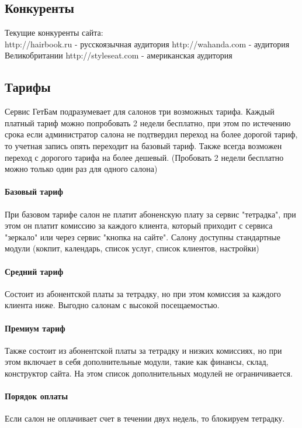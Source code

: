 \documentclass[DIV=calc, paper=a4, fontsize=11pt]{scrartcl} %
\begin{document}
\subsection{Конкуренты}
Текущие конкуренты сайта:
\\[0.5cm]
http://hairbook.ru - русскоязычная аудитория
\newline http://wahanda.com - аудитория Великобритании
\newline http://styleseat.com - американская аудитория

\subsection{Тарифы} \label{subsec:tariffs}
Сервис ГетБам подразумевает для салонов три возможных тарифа. Каждый платный тариф можно попробовать 2 недели бесплатно, при этом по истечению срока если администратор салона не подтвердил переход на более дорогой тариф, то учетная запись опять переходит на базовый тариф. Также всегда возможен переход с дорогого тарифа на более дешевый. (Пробовать 2 недели бесплатно можно только один раз для одного салона)

\paragraph{Базовый тариф}
При базовом тарифе салон не платит абоненскую плату за сервис "тетрадка", при этом он платит комиссию за каждого клиента, который приходит с сервиса "зеркало" или через сервис "кнопка на сайте". Салону доступны стандартные модули (кокпит, календарь, список услуг, список клиентов, настройки)

\paragraph{Средний тариф}
Состоит из абонентской платы за тетрадку, но при этом комиссия за каждого клиента ниже. Выгодно салонам с высокой посещаемостью.

\paragraph{Премиум тариф}
Также состоит из абонентской платы за тетрадку и низких комиссиях, но при этом включает в себя дополнительные модули, такие как финансы, склад, конструктор сайта. На этом список дополнительных модулей не ограничивается.

\paragraph{Порядок оплаты}
Если салон не оплачивает счет в течении двух недель, то блокируем тетрадку.
\end{document}
